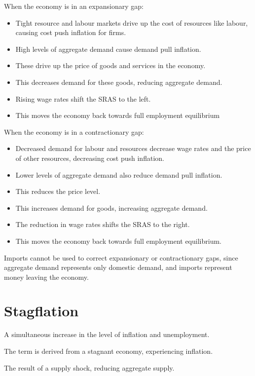\documentclass[a4paper,11pt]{report}
\begin{document}
When the economy is in an expansionary gap:

\begin{itemize}
\item Tight resource and labour markets drive up the cost of resources like
	labour, causing cost push inflation for firms.
\item High levels of aggregate demand cause demand pull inflation.
\item These drive up the price of goods and services in the economy.
\item This decreases demand for these goods, reducing aggregate demand.
\item Rising wage rates shift the SRAS to the left.
\item This moves the economy back towards full employment equilibrium
\end{itemize}

When the economy is in a contractionary gap:

\begin{itemize}
\item Decreased demand for labour and resources decrease wage rates and the
	price of other resources, decreasing cost push inflation.
\item Lower levels of aggregate demand also reduce demand pull inflation.
\item This reduces the price level.
\item This increases demand for goods, increasing aggregate demand.
\item The reduction in wage rates shifts the SRAS to the right.
\item This moves the economy back towards full employment equilibrium.
\end{itemize}

Imports cannot be used to correct expansionary or contractionary gaps, since
aggregate demand represents only domestic demand, and imports represent money
leaving the economy.


\section{Stagflation}

A simultaneous increase in the level of inflation and unemployment.

The term is derived from a stagnant economy, experiencing inflation.

The result of a supply shock, reducing aggregate supply.
\end{document}
